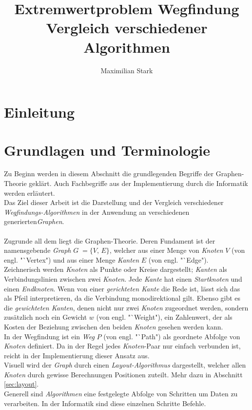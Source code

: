 \documentclass[12pt]{article}
\begin{document}
\title{Extremwertproblem Wegfindung \\  \large{\enspace Vergleich verschiedener Algorithmen}}

\author{Maximilian Stark}

\maketitle
\thispagestyle{empty}
\clearpage

\tableofcontents
\thispagestyle{empty}
\clearpage

\section{Einleitung}
\newpage

\section{Grundlagen und Terminologie}
Zu Beginn werden in diesem Abschnitt die grundlegenden Begriffe der Graphen-Theorie geklärt. Auch Fachbegriffe aus der Implementierung durch die Informatik werden erläutert.
\\
Das Ziel dieser Arbeit ist die Darstellung und der Vergleich verschiedener \textit{Wegfindungs-Algorithmen} in der Anwendung an verschiedenen generierten\textit{Graphen}.
\\\\
Zugrunde all dem liegt die Graphen-Theorie. Deren Fundament ist der namensgebende \textit{Graph} $G\; = \{V,\,E\}$, welcher aus einer Menge von \textit{Knoten} $V$ (von engl. "`Vertex") und aus einer Menge \textit{Kanten} $E$ (von engl. "`Edge").
\\
Zeichnerisch werden \textit{Knoten} als Punkte oder Kreise dargestellt; \textit{Kanten} als Verbindungslinien zwischen zwei \textit{Knoten}. Jede \textit{Kante} hat einen \textit{Startknoten} und einen \textit{Endknoten}. Wenn von einer \textit{gerichteten Kante} die Rede ist, lässt sich das als Pfeil interpretieren, da die Verbindung monodirektional gilt. Ebenso gibt es die \textit{gewichteten Kanten}, denen nicht nur zwei \textit{Knoten} zugeordnet werden, sondern zusätzlich noch ein Gewicht $w$ (von engl. "`Weight"), ein Zahlenwert, der als Kosten der Beziehung zwischen den beiden \textit{Knoten} gesehen werden kann.
\\
In der Wegfindung ist ein \textit{Weg} $P$ (von engl. "`Path") als geordnete Abfolge von \textit{Knoten} definiert. Da in der Regel jedes \textit{Knoten}-Paar nur einfach verbunden ist, reicht in der Implementierung dieser Ansatz aus.
\\
Visuell wird der \textit{Graph} durch einen \textit{Layout-Algorithmus} dargestellt, welcher allen \textit{Knoten} durch gewisse Berechnungen Positionen zuteilt. Mehr dazu in Abschnitt \ref{sec:layout}.
\\
Generell sind \textit{Algorithmen} eine festgelegte Abfolge von Schritten um Daten zu verarbeiten. In der Informatik sind diese einzelnen Schritte Befehle.
\newpage
\end{document}
